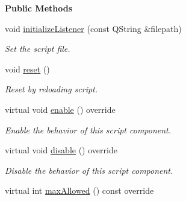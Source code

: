 \begin{Indent}\textbf{ Public Methods}\par
\begin{DoxyCompactItemize}
\item 
\mbox{\label{classrev_1_1_listener_component_a33722d18ab874e9d44deca1c75973893}} 
void \mbox{\hyperlink{classrev_1_1_listener_component_a33722d18ab874e9d44deca1c75973893}{initialize\+Listener}} (const Q\+String \&filepath)
\begin{DoxyCompactList}\small\item\em Set the script file. \end{DoxyCompactList}\item 
\mbox{\label{classrev_1_1_listener_component_a766e6cd9e9ebd3254f19305326256420}} 
void \mbox{\hyperlink{classrev_1_1_listener_component_a766e6cd9e9ebd3254f19305326256420}{reset}} ()
\begin{DoxyCompactList}\small\item\em Reset by reloading script. \end{DoxyCompactList}\item 
\mbox{\label{classrev_1_1_listener_component_afab6ecdb40b6ef774130ced43c570d91}} 
virtual void \mbox{\hyperlink{classrev_1_1_listener_component_afab6ecdb40b6ef774130ced43c570d91}{enable}} () override
\begin{DoxyCompactList}\small\item\em Enable the behavior of this script component. \end{DoxyCompactList}\item 
\mbox{\label{classrev_1_1_listener_component_a1d118197b33a22e722160d10eb4040ea}} 
virtual void \mbox{\hyperlink{classrev_1_1_listener_component_a1d118197b33a22e722160d10eb4040ea}{disable}} () override
\begin{DoxyCompactList}\small\item\em Disable the behavior of this script component. \end{DoxyCompactList}\item 
\mbox{\label{classrev_1_1_listener_component_a67eced059b106a622377d0223267144c}} 
virtual int \mbox{\hyperlink{classrev_1_1_listener_component_a67eced059b106a622377d0223267144c}{max\+Allowed}} () const override

\end{DoxyCompactItemize}
\end{Indent}
